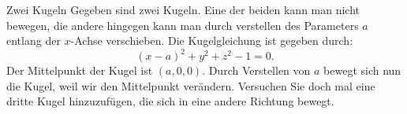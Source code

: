 \begin{surferPage}{Zwei Kugeln}
Gegeben sind zwei Kugeln. Eine der beiden kann man nicht bewegen, die andere hingegen kann man durch verstellen des Parameters $a$ entlang der $x$-Achse verschieben. Die Kugelgleichung ist gegeben durch:
\[(x-a)^2+y^2+z^2-1=0.\]
Der Mittelpunkt der Kugel ist $(a,0,0)$. Durch Verstellen von $a$ bewegt sich nun die Kugel, weil wir den Mittelpunkt verändern.
Versuchen Sie doch mal eine dritte Kugel hinzuzufügen, die sich in eine andere Richtung bewegt.
\end{surferPage}
